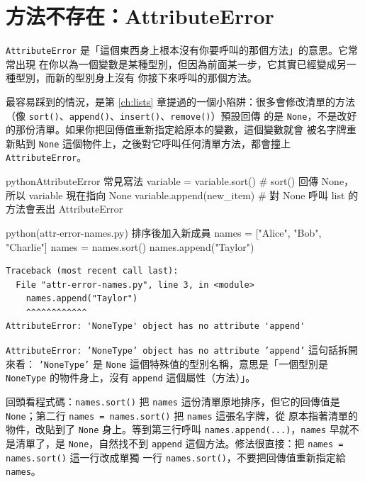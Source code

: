 
\section{方法不存在：AttributeError}
\label{sec:attribute-error}

\texttt{AttributeError} 是「這個東西身上根本沒有你要呼叫的那個方法」的意思。它常常出現
在你以為一個變數是某種型別，但因為前面某一步，它其實已經變成另一種型別，而新的型別身上沒有
你接下來呼叫的那個方法。

最容易踩到的情況，是第 \ref{ch:lists} 章提過的一個小陷阱：很多會修改清單的方法
（像 \texttt{sort()}、\texttt{append()}、\texttt{insert()}、\texttt{remove()}）預設回傳
的是 \texttt{None}，不是改好的那份清單。如果你把回傳值重新指定給原本的變數，這個變數就會
被名字牌重新貼到 \texttt{None} 這個物件上，之後對它呼叫任何清單方法，都會撞上
\texttt{AttributeError}。

\begin{code}{python}{AttributeError 常見寫法}
variable = variable.sort()     # sort() 回傳 None，所以 variable 現在指向 None
variable.append(new_item)      # 對 None 呼叫 list 的方法會丟出 AttributeError
\end{code}

\begin{example}{python}{(attr-error-names.py) 排序後加入新成員}
names = ["Alice", "Bob", "Charlie"]
names = names.sort()
names.append("Taylor")
\end{example}

\begin{verbatim}
Traceback (most recent call last):
  File "attr-error-names.py", line 3, in <module>
    names.append("Taylor")
    ^^^^^^^^^^^^
AttributeError: 'NoneType' object has no attribute 'append'
\end{verbatim}

\texttt{AttributeError: 'NoneType' object has no attribute 'append'} 這句話拆開來看：
\texttt{'NoneType'} 是 \texttt{None} 這個特殊值的型別名稱，意思是「一個型別是
\texttt{NoneType} 的物件身上，沒有 \texttt{append} 這個屬性（方法）」。

回頭看程式碼：\texttt{names.sort()} 把 \texttt{names} 這份清單原地排序，但它的回傳值是
\texttt{None}；第二行 \texttt{names = names.sort()} 把 \texttt{names} 這張名字牌，從
原本指著清單的物件，改貼到了 \texttt{None} 身上。等到第三行呼叫
\texttt{names.append(...)}，\texttt{names} 早就不是清單了，是 \texttt{None}，自然找不到
\texttt{append} 這個方法。修法很直接：把 \texttt{names = names.sort()} 這一行改成單獨
一行 \texttt{names.sort()}，不要把回傳值重新指定給 \texttt{names}。

